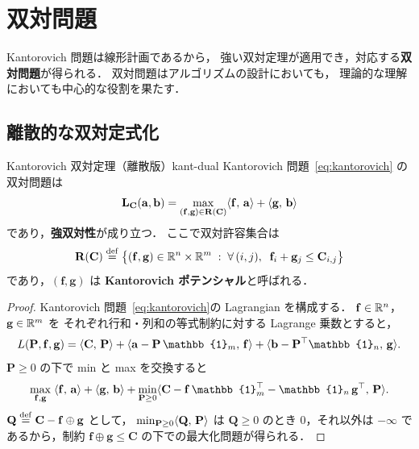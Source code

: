\section{双対問題}\label{sec:dual}

Kantorovich 問題は線形計画であるから，
強い双対定理が適用でき，対応する\textbf{双対問題}が得られる．
双対問題はアルゴリズムの設計においても，
理論的な理解においても中心的な役割を果たす．

\subsection{離散的な双対定式化}\label{subsec:dual-discrete}

\begin{proposition}{Kantorovich 双対定理（離散版）}{kant-dual}
Kantorovich 問題~\eqref{eq:kantorovich} の双対問題は
\begin{equation}\label{eq:dual}
  \mathbf{L_C}(\mathbf{a}, \mathbf{b})
  = \max_{(\mathbf{f}, \mathbf{g}) \in \mathbf{R}(\mathbf{C})}
  \langle \mathbf{f},\, \mathbf{a} \rangle + \langle \mathbf{g},\, \mathbf{b} \rangle
\end{equation}
であり，\textbf{強双対性}が成り立つ．
ここで双対許容集合は
\begin{equation}\label{eq:dual-feasible}
  \mathbf{R}(\mathbf{C}) \overset{\mathrm{def}}{=}
  \bigl\{
    (\mathbf{f}, \mathbf{g}) \in \mathbb{R}^n \times \mathbb{R}^m
    \;:\;
    \forall\, (i,j),\;\;
    \mathbf{f}_i + \mathbf{g}_j \leq \mathbf{C}_{i,j}
  \bigr\}
\end{equation}
であり，$(\mathbf{f}, \mathbf{g})$ は
\textbf{Kantorovich ポテンシャル}と呼ばれる．
\end{proposition}

\begin{proof}
Kantorovich 問題~\eqref{eq:kantorovich}の
Lagrangian を構成する．
$\mathbf{f} \in \mathbb{R}^n$，$\mathbf{g} \in \mathbb{R}^m$ を
それぞれ行和・列和の等式制約に対する Lagrange 乗数とすると，
\begin{equation}\label{eq:lagrangian}
  L(\mathbf{P}, \mathbf{f}, \mathbf{g})
  = \inner{\mathbf{C}}{\mathbf{P}}
  + \inner{\mathbf{a} - \mathbf{P}\, \mathbb{1}_m}{\mathbf{f}}
  + \inner{\mathbf{b} - \mathbf{P}^\top \mathbb{1}_n}{\mathbf{g}}.
\end{equation}
$\mathbf{P} \geq 0$ の下で min と max を交換すると
\[
  \max_{\mathbf{f}, \mathbf{g}} \;
  \inner{\mathbf{f}}{\mathbf{a}} + \inner{\mathbf{g}}{\mathbf{b}}
  + \min_{\mathbf{P} \geq 0}
  \inner{\mathbf{C} - \mathbf{f}\, \mathbb{1}_m^\top
    - \mathbb{1}_n\, \mathbf{g}^\top}{\mathbf{P}}.
\]
$\mathbf{Q} \overset{\mathrm{def}}{=} \mathbf{C} - \mathbf{f} \oplus \mathbf{g}$
として，
$\min_{\mathbf{P} \geq 0} \langle \mathbf{Q},\, \mathbf{P} \rangle$
は $\mathbf{Q} \geq 0$ のとき $0$，それ以外は $-\infty$
であるから，制約 $\mathbf{f} \oplus \mathbf{g} \leq \mathbf{C}$
の下での最大化問題が得られる．
\end{proof}

